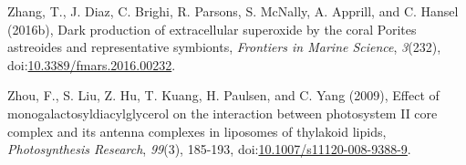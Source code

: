 \begin{singlespace}
{{Zhang, T., J. Diaz, C. Brighi, R. Parsons, S. McNally, A. Apprill, and C. Hansel (2016b), Dark production of extracellular superoxide by the coral Porites astreoides and representative symbionts, \emph{Frontiers in Marine Science}, \emph{3}(232), doi:\href{http://dx.doi.org/10.3389/fmars.2016.00232}{10.3389/fmars.2016.00232}.

Zhou, F., S. Liu, Z. Hu, T. Kuang, H. Paulsen, and C. Yang (2009), Effect of monogalactosyldiacylglycerol on the interaction between photosystem II core complex and its antenna complexes in liposomes of thylakoid lipids, \emph{Photosynthesis Research}, \emph{99}(3), 185-193, doi:\href{http://dx.doi.org/10.1007/s11120-008-9388-9}{10.1007/s11120-008-9388-9}.}}
\end{singlespace}

\clearpage

